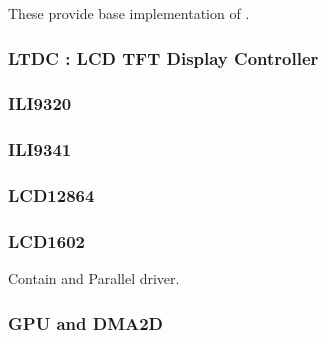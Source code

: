 
These provide base implementation of .

\subsubsection{LTDC : LCD TFT Display Controller}

\subsubsection{ILI9320}
\subsubsection{ILI9341}
\subsubsection{LCD12864}
\subsubsection{LCD1602}

Contain  and {Parallel} driver.

\subsubsection{GPU and DMA2D}



